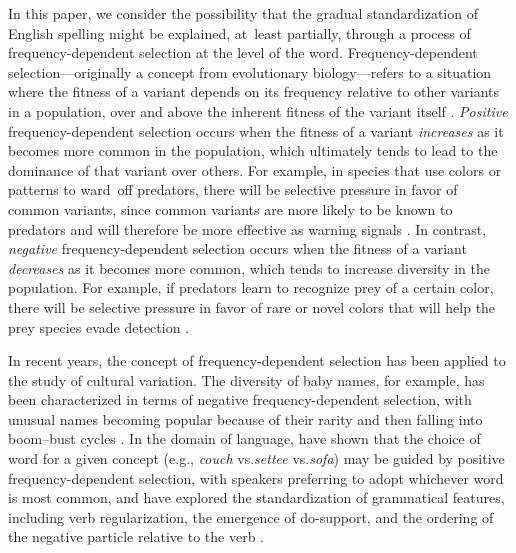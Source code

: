 \documentclass[doc,biblatex]{apa7}
\begin{document}
In this paper, we consider the possibility that the gradual standardization of English spelling might be explained, at~least partially, through a process of frequency-dependent selection at the level of the word. Frequency-dependent selection---originally a concept from evolutionary biology---refers to a situation where the fitness of a variant depends on its frequency relative to other variants in a population, over and above the inherent fitness of the variant itself \parencite{Svensson:2019}. \textit{Positive} frequency-dependent selection occurs when the fitness of a variant \textit{increases} as it becomes more common in the population, which ultimately tends to lead to the dominance of that variant over others. For example, in species that use colors or patterns to ward~off predators, there will be selective pressure in favor of common variants, since common variants are more likely to be known to predators and will therefore be more effective as warning signals \parencite{Chouteau:2016}. In contrast, \textit{negative} frequency-dependent selection occurs when the fitness of a variant \textit{decreases} as it becomes more common, which tends to increase diversity in the population. For example, if predators learn to recognize prey of a certain color, there will be selective pressure in favor of rare or novel colors that will help the prey species evade detection \parencite{Allen:1984}.

In recent years, the concept of frequency-dependent selection has been applied to the study of cultural variation. The diversity of baby names, for example, has been characterized in terms of negative frequency-dependent selection, with unusual names becoming popular because of their rarity and then falling into boom--bust cycles \parencite{Newberry:2022}. In the domain of language, \textcite{Pagel:2019} have shown that the choice of word for a given concept (e.g., \textit{couch} vs.\@ \textit{settee} vs.\@ \textit{sofa}) may be guided by positive frequency-dependent selection, with speakers preferring to adopt whichever word is most common, and \textcite{Newberry:2017} have explored the standardization of grammatical features, including verb regularization, the emergence of do-support, and the ordering of the negative particle relative to the verb \parencite[see also][]{Karjus:2020, GuerreroMontero:2023}.
\end{document}
